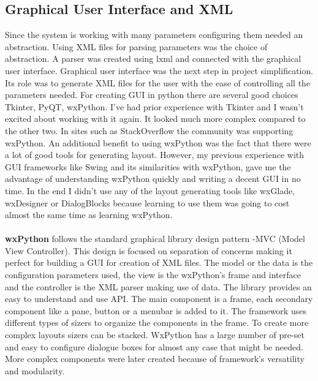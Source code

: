 \subsection{Graphical User Interface and XML}
Since the system is working with many parameters configuring them needed an abstraction. Using XML files for parsing parameters was the choice of abstraction. A parser was created
using lxml\cite{lxml} and connected with the graphical user interface.
Graphical user interface was the next step in project simplification. Its role was to generate XML files for the user with the ease of controlling all the parameters needed.
For creating GUI in python there are several good choices Tkinter, PyQT, wxPython. I've had prior experience with Tkinter and I wasn't excited about working with it again. It looked
much more complex compared to the other two. In sites such as StackOverflow the community was supporting wxPython. An additional benefit to using wxPython was the fact that there were a
lot of good tools for generating layout. However, my previous experience with GUI frameworks like Swing and its similarities with wxPython, gave me the advantage of understanding wxPython
quickly and writing a decent GUI in no time. In the end I didn't use any of the layout generating tools like wxGlade, wxDesigner or DialogBlocks because learning to use them was going to
cost almost the same time as learning wxPython.
\paragraph{}
\textbf{wxPython} follows the standard graphical library design pattern -MVC (Model View Controller).
This design is focused on separation of concerns making it perfect for building a GUI for creation of XML files. The model or the 
data is the configuration parameters used, the view is the wxPython's frame and interface and the controller is the XML parser making use of data.
The library provides an easy to understand and use API. The main component is a frame, each secondary component like a pane, button or a menubar
is added to it. The framework uses different types of sizers to organize the components in the frame. To create more complex layouts
sizers can be stacked. WxPython has a large number of pre-set and easy to configure dialogue boxes for almost any case that might be needed.
More complex components were later created because of framework's versatility and modularity.